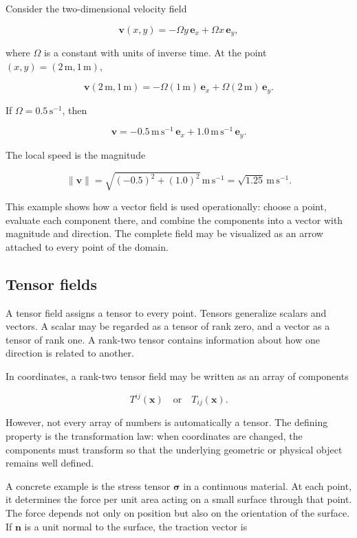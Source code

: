 Consider the two-dimensional velocity field

\[
\mathbf{v}(x,y)
=
-\Omega y\,\mathbf{e}_{x}
+
\Omega x\,\mathbf{e}_{y},
\]

where \(\Omega\) is a constant with units of inverse time. At the point \((x,y)=(2\,\mathrm{m},1\,\mathrm{m})\),

\[
\mathbf{v}(2\,\mathrm{m},1\,\mathrm{m})
=
-\Omega(1\,\mathrm{m})\,\mathbf{e}_{x}
+
\Omega(2\,\mathrm{m})\,\mathbf{e}_{y}.
\]

If \(\Omega=0.5\,\mathrm{s^{-1}}\), then

\[
\mathbf{v}
=
-0.5\,\mathrm{m\,s^{-1}}\,\mathbf{e}_{x}
+
1.0\,\mathrm{m\,s^{-1}}\,\mathbf{e}_{y}.
\]

The local speed is the magnitude

\[
\lVert\mathbf{v}\rVert
=
\sqrt{(-0.5)^2+(1.0)^2}\,\mathrm{m\,s^{-1}}
=
\sqrt{1.25}\,\mathrm{m\,s^{-1}}.
\]

This example shows how a vector field is used operationally: choose a point, evaluate each component there, and combine the components into a vector with magnitude and direction. The complete field may be visualized as an arrow attached to every point of the domain.

\subsection{Tensor fields}

A tensor field assigns a tensor to every point. Tensors generalize scalars and vectors. A scalar may be regarded as a tensor of rank zero, and a vector as a tensor of rank one. A rank-two tensor contains information about how one direction is related to another.

In coordinates, a rank-two tensor field may be written as an array of components

\[
T^{ij}(\mathbf{x})
\quad\text{or}\quad
T_{ij}(\mathbf{x}).
\]

However, not every array of numbers is automatically a tensor. The defining property is the transformation law: when coordinates are changed, the components must transform so that the underlying geometric or physical object remains well defined.

A concrete example is the stress tensor \(\boldsymbol{\sigma}\) in a continuous material. At each point, it determines the force per unit area acting on a small surface through that point. The force depends not only on position but also on the orientation of the surface. If \(\mathbf{n}\) is a unit normal to the surface, the traction vector is

